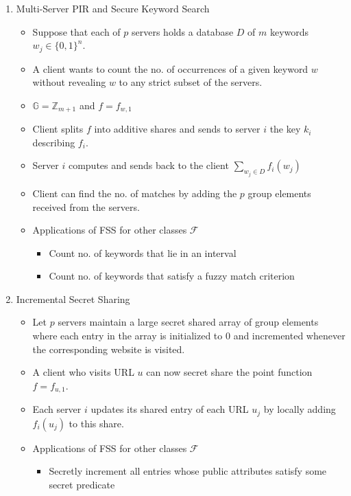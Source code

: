 \begin{enumerate}
    \item Multi-Server PIR and Secure Keyword Search
    \begin{itemize}
        \item Suppose that each of $p$ servers holds a database $D$ of $m$ keywords $w_j \in \{0, 1\}^n$.
        \item A client wants to count the no. of occurrences of a given keyword $w$ without revealing $w$ to any strict subset of the servers.
        \item $\mathbb{G} = \mathbb{Z}_{m+1}$ and $f = f_{w, 1}$
        \item Client splits $f$ into additive shares and sends to server $i$ the key $k_i$ describing $f_i$.
        \item Server $i$ computes and sends back to the client $\sum_{w_j \in D}f_i(w_j)$
        \item Client can find the no. of matches by adding the $p$ group elements received from the servers.
        \item Applications of FSS for other classes $\mathcal{F}$
        \begin{itemize}
            \item Count no. of keywords that lie in an interval
            \item Count no. of keywords that satisfy a fuzzy match criterion
        \end{itemize}
    \end{itemize}
    \item Incremental Secret Sharing
    \begin{itemize}
        \item Let $p$ servers maintain a large secret shared array of group elements where each entry in the array is initialized to 0 and incremented whenever the corresponding website is visited.
        \item A client who visits URL $u$ can now secret share the point function $f = f_{u, 1}$.
        \item Each server $i$ updates its shared entry of each URL $u_j$ by locally adding $f_i(u_j)$ to this share.
        \item Applications of FSS for other classes $\mathcal{F}$
        \begin{itemize}
            \item Secretly increment all entries whose public attributes satisfy some secret predicate 
        \end{itemize}
    \end{itemize}
\end{enumerate}

